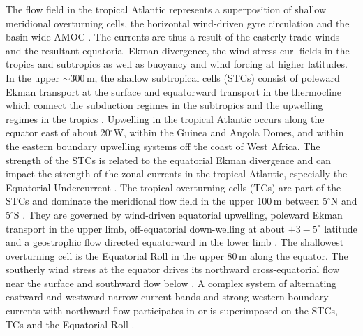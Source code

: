 \documentclass[os, manuscript]{copernicus}
\begin{document}
	The flow field in the tropical Atlantic represents a superposition of shallow meridional overturning cells, the horizontal wind-driven gyre circulation and the basin-wide AMOC \citep[e.g.][]{Schott2004,Hazeleger2006,Perez2014,Tuchen2022,Heukamp2022}. The currents are thus a result of the easterly trade winds and the resultant equatorial Ekman divergence, the wind stress curl fields in the tropics and subtropics as well as buoyancy and wind forcing at higher latitudes. In the upper $ \sim $300$\,$m, the shallow subtropical cells (STCs) consist of poleward Ekman transport at the surface and equatorward transport in the thermocline which connect the subduction regimes in the subtropics and the upwelling regimes in the tropics \citep{Schott2004}. Upwelling in the tropical Atlantic occurs along the equator east of about 20$^{\circ}$W, within the Guinea and Angola Domes, and within the eastern boundary upwelling systems off the coast of West Africa. The strength of the STCs is related to the equatorial Ekman divergence \citep{Tuchen2019,Rabe2008} and can impact the strength of the zonal currents in the tropical Atlantic, especially the Equatorial Undercurrent \cite[EUC;][]{Rabe2008,Brandt2021a}. The tropical overturning cells (TCs) are part of the STCs and dominate the meridional flow field in the upper 100$\,$m between 5$^{\circ}$N and 5$^{\circ}$S \citep[e.g.][]{McCreary1994,Schott2004,Molinari2003,Perez2014}. They are governed by wind-driven equatorial upwelling, poleward Ekman transport in the upper limb, off-equatorial down-welling at about $ \pm3-5^{\circ}$ latitude and a geostrophic flow directed equatorward in the lower limb \citep[e.g.][]{Perez2014}. The shallowest overturning cell is the Equatorial Roll in the upper 80$\,$m along the equator. The southerly wind stress at the equator drives its  northward cross-equatorial flow near the surface and southward flow below \citep{Heukamp2022}. A complex system of alternating eastward and westward narrow current bands and strong western boundary currents with northward flow participates in or is superimposed on the STCs, TCs and the Equatorial Roll \citep[e.g.][]{Schott2004}. 
	
\end{document}

